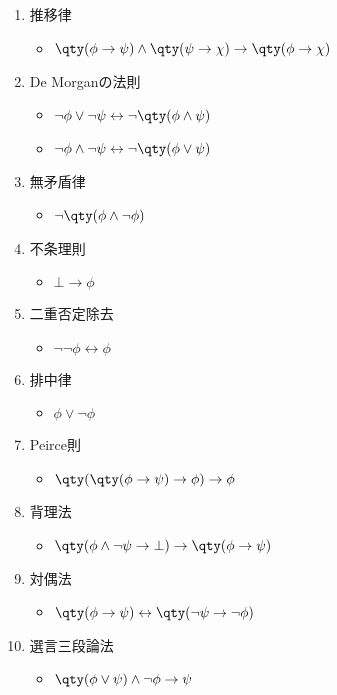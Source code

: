 {\begin{enumerate}
\begin{itemize}
      \item $\phi \land \qty(\psi \lor \chi) \leftrightarrow \qty(\phi \land \psi) \lor \qty(\phi \land \chi)$
    \end{itemize}
    \item 推移律
    \begin{itemize}
      \item $\qty(\phi \rightarrow \psi) \land \qty(\psi \rightarrow \chi) \rightarrow \qty(\phi \rightarrow \chi)$
    \end{itemize}
    \item De Morganの法則
    \begin{itemize}
      \item $\lnot \phi \lor \lnot \psi \leftrightarrow \lnot \qty(\phi \land \psi)$
      \item $\lnot \phi \land \lnot \psi \leftrightarrow \lnot \qty(\phi \lor \psi)$
    \end{itemize}
    \item 無矛盾律
    \begin{itemize}
      \item $\lnot \qty(\phi \land \lnot \phi)$
    \end{itemize}
    \item 不条理則
    \begin{itemize}
      \item $\bot \rightarrow \phi$
    \end{itemize}
    \item 二重否定除去
    \begin{itemize}
      \item $\lnot \lnot \phi \leftrightarrow \phi$
    \end{itemize}
    \item 排中律
    \begin{itemize}
      \item $\phi \lor \lnot \phi$
    \end{itemize}
    \item Peirce則
    \begin{itemize}
      \item $\qty(\qty(\phi \rightarrow \psi) \rightarrow \phi) \rightarrow \phi$
    \end{itemize}
    \item 背理法
    \begin{itemize}
      \item $\qty(\phi \land \lnot \psi \rightarrow \bot) \rightarrow \qty(\phi \rightarrow \psi)$
    \end{itemize}
    \item 対偶法
    \begin{itemize}
      \item $\qty(\phi \rightarrow \psi) \leftrightarrow \qty(\lnot \psi \rightarrow \lnot \phi)$
    \end{itemize}
    \item 選言三段論法
    \begin{itemize}
      \item $\qty(\phi \lor \psi) \land \lnot \phi \rightarrow \psi$
    \end{itemize}
  \end{enumerate}
}


